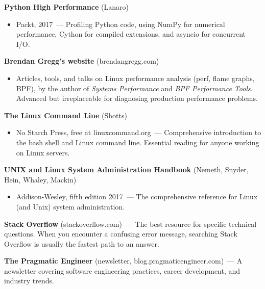 \noindent{}\textbf{Python High Performance} (Lanaro)

\begin{itemize}
\tightlist
\item
  Packt, 2017~--- Profiling Python code, using NumPy for numerical performance, Cython for compiled extensions, and asyncio for concurrent I/O.
\end{itemize}

\noindent{}\textbf{Brendan Gregg's website} (brendangregg.com)

\begin{itemize}
\tightlist
\item
  Articles, tools, and talks on Linux performance analysis (perf, flame graphs, BPF), by the author of \emph{Systems Performance} and \emph{BPF Performance Tools}. Advanced but irreplaceable for diagnosing production performance problems.
\end{itemize}

\label{44-appendices:d8-command-line-and-linux}

\textbf{The Linux Command Line} (Shotts)

\begin{itemize}
\tightlist
\item
  No Starch Press, free at linuxcommand.org~--- Comprehensive introduction to the bash shell and Linux command line. Essential reading for anyone working on Linux servers.
\end{itemize}

\noindent{}\textbf{UNIX and Linux System Administration Handbook} (Nemeth, Snyder, Hein, Whaley, Mackin)

\begin{itemize}
\tightlist
\item
  Addison-Wesley, fifth edition 2017~--- The comprehensive reference for Linux (and Unix) system administration.
\end{itemize}

\label{44-appendices:d9-online-resources}

\textbf{Stack Overflow} (stackoverflow.com)~--- The best resource for specific technical questions. When you encounter a confusing error message, searching Stack Overflow is usually the fastest path to an answer.

\textbf{The Pragmatic Engineer} (newsletter, blog.pragmaticengineer.com)~--- A newsletter covering software engineering practices, career development, and industry trends.

